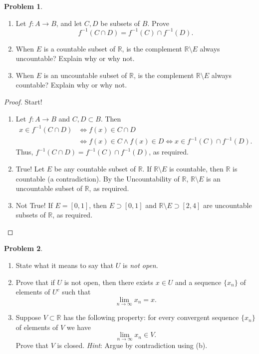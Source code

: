 \documentclass[12pt]{article}
\theoremstyle{definition}
\newtheorem{problem}{Problem}
\begin{document}
\thispagestyle{firstpage}

\begin{problem}
    \hfill
    \begin{enumerate}[label=(\alph*)]
        \item Let \(f : A \to B\), and let \(C, D\) be subsets of \(B\). Prove 
        \[
            f^{-1}(C \cap D) = f^{-1}(C) \cap f^{-1}(D).
        \]
        \item When \(E\) is a countable subset of \(\mathbb{R}\), is the complement \(\mathbb{R} \setminus E\) always uncountable? Explain why or why not.
        \item When \(E\) is an uncountable subset of \(\mathbb{R}\), is the complement \(\mathbb{R} \setminus E\) always countable? Explain why or why not.
    \end{enumerate}
\end{problem}

\begin{proof}
    Start!
    \begin{enumerate}[label=(\alph*)]
        \item Let \(f : A \to B\) and \(C, D \subset B\). Then
        \begin{align*}
            x \in f^{-1}(C \cap D) &\iff f(x) \in C \cap D \\
            &\iff f(x) \in C \land f(x) \in D \iff x \in f^{-1}(C) \cap f^{-1}(D).
        \end{align*}
        Thus, \(f^{-1}(C \cap D) = f^{-1}(C) \cap f^{-1}(D)\), as required.
        \item True! Let \(E\) be any countable subset of \(\mathbb{R}\). If \(\mathbb{R} \setminus E\) is countable, then \(\mathbb{R}\) is countable (a contradiction). By the Uncountability of \(\mathbb{R}\), \(\mathbb{R} \setminus E\) is an uncountable subset of \(\mathbb{R}\), as required.
        \item Not True! If \(E = [0,1]\), then \(E \supset [0,1]\) and \(\mathbb{R} \setminus E \supset [2,4]\) are uncountable subsets of \(\mathbb{R}\), as required.
    \end{enumerate}
\end{proof}

\begin{problem}
    \hfill
    \begin{enumerate}[label=(\alph*)]
        \item State what it means to say that \(U\) is \textit{not open}.
        \item Prove that if \(U\) is not open, then there exists \(x \in U\) and a sequence \(\{x_n\}\) of elements of \(U^c\) such that
        \[
            \lim_{n \to \infty}x_n = x.
        \]
        \item Suppose \(V \subset \mathbb{R}\) has the following property: for every convergent sequence \(\{x_n\}\) of elements of \(V\) we have 
        \[
            \lim_{n \to \infty}x_n \in V.
        \]
        Prove that \(V\) is closed. \textit{Hint}: Argue by contradiction using (b).
    \end{enumerate}
\end{problem}
\end{document}
